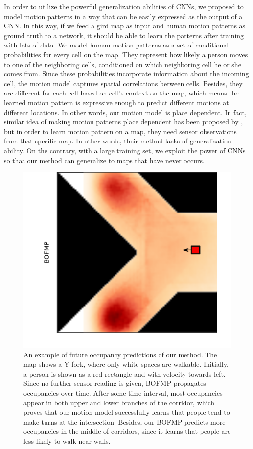 In order to utilize the powerful generalization abilities of CNNs, we proposed to model motion patterns in a way that can be easily expressed as the output of a CNN. In this way, if we feed a gird map as input and human motion patterns as ground truth to a network, it should be able to learn the patterns after training with lots of data. We model human motion patterns as a set of conditional probabilities for every cell on the map. They represent how likely a person moves to one of the neighboring cells, conditioned on which neighboring cell he or she comes from. Since these probabilities incorporate information about the incoming cell, the motion model captures spatial correlations between cells. Besides, they are different for each cell based on cell's context on the map, which means the learned motion pattern is expressive enough to predict different motions at different locations. In other words, our motion model is place dependent. In fact, similar idea of making motion patterns place dependent has been proposed by \cite{kucner2013conditional}, but in order to learn motion pattern on a map, they need sensor observations from that specific map. In other words, their method lacks of generalization ability. On the contrary, with a large training set, we exploit the power of CNNs so that our method can generalize to maps that have never occurs.

\begin{figure}[H]
  \centering
    \includegraphics[width=.6\textwidth]{figures/theme_plot_1.png}
    \caption[An example of future occupancy predictions of our method.]{An example of future occupancy predictions of our method.  The map shows a Y-fork, where only white spaces are walkable. Initially, a person is shown as a red rectangle and with velocity towards left. Since no further sensor reading is given, BOFMP propagates occupancies over time. After some time interval, most occupancies appear in both upper and lower branches of the corridor, which proves that our motion model successfully learns that people tend to make turns at the intersection. Besides, our BOFMP predicts more occupancies in the middle of corridors, since it learns that people are less likely to walk near walls.}
    \label{fig:idea}
\end{figure}

